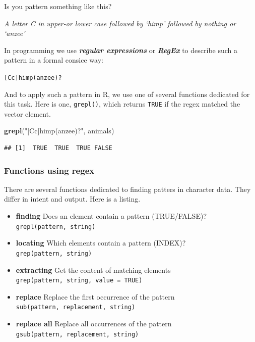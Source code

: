 \documentclass[]{book}
\newenvironment{Shaded}{\begin{snugshade}}{\end{snugshade}}
\newcommand{\KeywordTok}[1]{\textcolor[rgb]{0.13,0.29,0.53}{\textbf{#1}}}
\newcommand{\NormalTok}[1]{#1}
\newcommand{\StringTok}[1]{\textcolor[rgb]{0.31,0.60,0.02}{#1}}
\providecommand{\tightlist}{%
  \setlength{\itemsep}{0pt}\setlength{\parskip}{0pt}}
\begin{document}
Is you pattern something like this?

\emph{A letter C in upper-or lower case followed by `himp' followed by nothing or `anzee'}

In programming we use \textbf{\emph{regular expressions}} or \textbf{\emph{RegEx}} to describe such a pattern in a formal consice way:

\texttt{{[}Cc{]}himp(anzee)?}

And to apply such a pattern in R, we use one of several functions dedicated for this task. Here is one, \texttt{grepl()}, which returns \texttt{TRUE} if the regex matched the vector element.

\begin{Shaded}
\begin{Highlighting}[]
\KeywordTok{grepl}\NormalTok{(}\StringTok{"[Cc]himp(anzee)?"}\NormalTok{, animals)}
\end{Highlighting}
\end{Shaded}

\begin{verbatim}
## [1]  TRUE  TRUE  TRUE FALSE
\end{verbatim}

\hypertarget{functions-using-regex}{%
\subsubsection*{Functions using regex}\label{functions-using-regex}}

There are several functions dedicated to finding patters in character data. They differ in intent and output. Here is a listing.

\begin{itemize}
\tightlist
\item
  \textbf{finding} Does an element contain a pattern (TRUE/FALSE)? \texttt{grepl(pattern,\ string)}
\item
  \textbf{locating} Which elements contain a pattern (INDEX)? \texttt{grep(pattern,\ string)}
\item
  \textbf{extracting} Get the content of matching elements \texttt{grep(pattern,\ string,\ value\ =\ TRUE)}
\item
  \textbf{replace} Replace the first occurrence of the pattern \texttt{sub(pattern,\ replacement,\ string)}
\item
  \textbf{replace all} Replace all occurrences of the pattern \texttt{gsub(pattern,\ replacement,\ string)}
\end{itemize}
\end{document}
